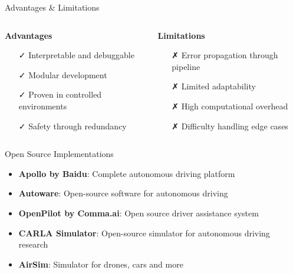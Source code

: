 \documentclass[aspectratio=169]{beamer}
\begin{document}
\begin{frame}{Advantages \& Limitations}
    \begin{columns}
        \begin{column}{0.5\textwidth}
            \textbf{Advantages}
            \begin{itemize}
                \item[\textcolor{aiGreen}{✓}] Interpretable and debuggable
                \item[\textcolor{aiGreen}{✓}] Modular development
                \item[\textcolor{aiGreen}{✓}] Proven in controlled environments
                \item[\textcolor{aiGreen}{✓}] Safety through redundancy
            \end{itemize}
        \end{column}
        \begin{column}{0.5\textwidth}
            \textbf{Limitations}
            \begin{itemize}
                \item[\textcolor{errorRed}{✗}] Error propagation through pipeline
                \item[\textcolor{errorRed}{✗}] Limited adaptability
                \item[\textcolor{errorRed}{✗}] High computational overhead
                \item[\textcolor{errorRed}{✗}] Difficulty handling edge cases
            \end{itemize}
        \end{column}
    \end{columns}
\end{frame}

\begin{frame}{Open Source Implementations}
    \begin{itemize}
        \item \textbf{Apollo by Baidu}: Complete autonomous driving platform
        \item \textbf{Autoware}: Open-source software for autonomous driving
        \item \textbf{OpenPilot by Comma.ai}: Open source driver assistance system
        \item \textbf{CARLA Simulator}: Open-source simulator for autonomous driving research
        \item \textbf{AirSim}: Simulator for drones, cars and more
    \end{itemize}
\end{frame}
\end{document}
